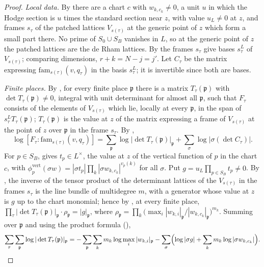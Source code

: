\begin{proof}
\emph{Local data.} By  there are a chart $c$ with
$w_{k,c_k}\ne0$, a unit $u$ in which the Hodge section is $u$ times the standard section near $z$, with value
$u_L\ne0$ at $z$, and frames $s_\tau$ of the patched lattices $V_{s(\tau)}$ at the generic point of $z$ which form a
small part there. No prime of $S_0\cup S_B$ vanishes in $L$, so at the generic point of $z$ the patched lattices are
the de Rham lattices. By  the frames $s_\tau$ give bases
$s^L_\tau$ of $V_{s(\tau)}$; comparing dimensions, $r+k=N-j=j'$. Let $C_\tau$ be the matrix expressing
$\mathrm{fam}_{s(\tau)}(v,q_\tau)$ in the basis $s^L_\tau$; it is invertible since both are bases.

\emph{Finite places.} By , for every finite place
$\mathfrak p$ there is a matrix $T_\tau(\mathfrak p)$ with $\det T_\tau(\mathfrak p)\ne0$, integral with unit
determinant for almost all $\mathfrak p$, such that $F_\tau$ consists of the elements of $V_{s(\tau)}$ which lie,
locally at every $\mathfrak p$, in the span of $s^L_\tau T_\tau(\mathfrak p)$; $T_\tau(\mathfrak p)$ is the value at $z$
of the matrix expressing a frame of $V_{s(\tau)}$ at the point of $z$ over $\mathfrak p$ in the frame $s_\tau$. By
,
\begin{equation}\label{pf:towergeo:eq-idx}
\log[F_\tau:\mathrm{fam}_{s(\tau)}(v,q_\tau)]=\sum_{\mathfrak p}\log|\det T_\tau(\mathfrak p)|_{\mathfrak p}
+\sum_\sigma\log|\sigma(\det C_\tau)|.
\end{equation}
For $p\in S_B$,  gives $t_p\in L^\times$, the value
at $z$ of the vertical function of $p$ in the chart $c$, with
$\phi^{\mathrm{vert}}_p(\sigma w)=|\sigma t_p|\prod_k|\sigma w_{k,c_k}|^{v_p(k)}$ for all $\sigma$. Put
$g=u_L\prod_{p\in S_B}t_p\ne0$. By , the inverse of the tensor
product of the determinant lattices of the $V_{s(\tau)}$ in the frames $s_\tau$ is the line bundle of multidegree $m$,
with a generator whose value at $z$ is $g$ up to the chart monomial; hence by
, at every finite place,
$\prod_\tau|\det T_\tau(\mathfrak p)|_{\mathfrak p}\cdot\rho_{\mathfrak p}=|g|_{\mathfrak p}$, where
$\rho_{\mathfrak p}=\prod_k\bigl(\max_i|w_{k,i}|_{\mathfrak p}/|w_{k,c_k}|_{\mathfrak p}\bigr)^{m_k}$. Summing over
$\mathfrak p$ and using the product formula (),
\begin{equation}\label{pf:towergeo:eq-fin}
\sum_\tau\sum_{\mathfrak p}\log|\det T_\tau(\mathfrak p)|_{\mathfrak p}
=-\sum_{\mathfrak p}\sum_km_k\log\max_i|w_{k,i}|_{\mathfrak p}-\sum_\sigma\Bigl(\log|\sigma g|+\sum_km_k\log|\sigma w_{k,c_k}|\Bigr).
\end{equation}


\end{proof}
